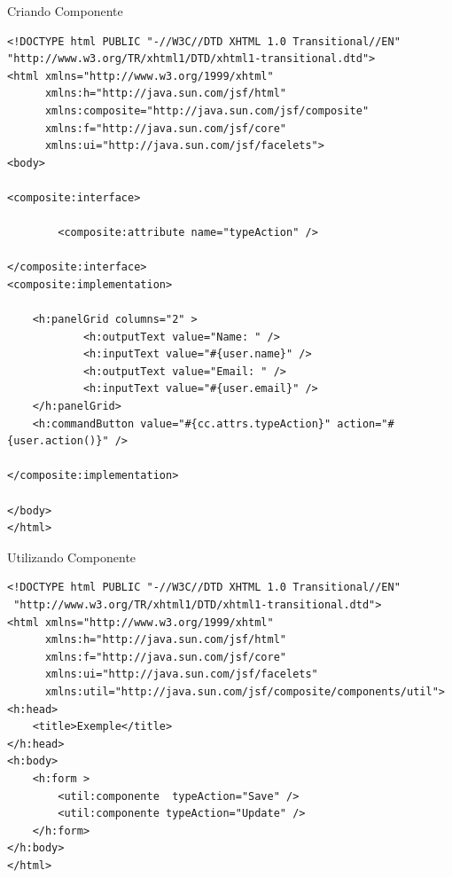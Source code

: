 \documentclass[xcolor=dvipsnames]{beamer}
\begin{document}
\begin{frame}[fragile]{Criando Componente}
	\begin{lstlisting}[style=HTML]
<!DOCTYPE html PUBLIC "-//W3C//DTD XHTML 1.0 Transitional//EN"
"http://www.w3.org/TR/xhtml1/DTD/xhtml1-transitional.dtd">
<html xmlns="http://www.w3.org/1999/xhtml"
      xmlns:h="http://java.sun.com/jsf/html"
      xmlns:composite="http://java.sun.com/jsf/composite"
      xmlns:f="http://java.sun.com/jsf/core"
      xmlns:ui="http://java.sun.com/jsf/facelets">
<body>

<composite:interface>

		<composite:attribute name="typeAction" />

</composite:interface>
<composite:implementation>

	<h:panelGrid columns="2" >
			<h:outputText value="Name: " />
			<h:inputText value="#{user.name}" />
			<h:outputText value="Email: " />
			<h:inputText value="#{user.email}" />		
	</h:panelGrid>
	<h:commandButton value="#{cc.attrs.typeAction}" action="#{user.action()}" />

</composite:implementation>

</body>
</html>	
	\end{lstlisting}
\end{frame}




\begin{frame}[fragile]{Utilizando Componente}
	\begin{lstlisting}[style=HTML]
<!DOCTYPE html PUBLIC "-//W3C//DTD XHTML 1.0 Transitional//EN"
 "http://www.w3.org/TR/xhtml1/DTD/xhtml1-transitional.dtd"> 
<html xmlns="http://www.w3.org/1999/xhtml"
      xmlns:h="http://java.sun.com/jsf/html"
      xmlns:f="http://java.sun.com/jsf/core"
      xmlns:ui="http://java.sun.com/jsf/facelets"
      xmlns:util="http://java.sun.com/jsf/composite/components/util"> 
<h:head>
	<title>Exemple</title>
</h:head> 
<h:body> 
	<h:form >
		<util:componente  typeAction="Save" />
		<util:componente typeAction="Update" />
	</h:form>
</h:body> 
</html>
	\end{lstlisting}
\end{frame}
\end{document}
